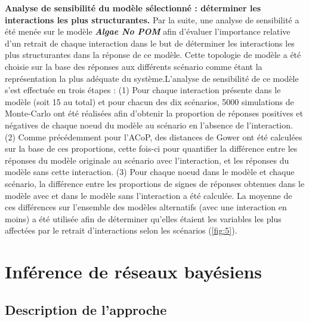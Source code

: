 \documentclass[12pt]{report}
\begin{document}
\textbf{Analyse de sensibilité du modèle sélectionné : déterminer les interactions les plus structurantes.} Par la suite, une analyse de sensibilité a été menée sur le modèle \textbf{\textit{Algae No POM}} afin d'évaluer l'importance relative d'un retrait de chaque interaction dans le but de déterminer les interactions les plus structurantes dans la réponse de ce modèle. Cette topologie de modèle a été choisie sur la base des réponses aux différents scénario comme étant la représentation la plus adéquate du système.L'analyse de sensibilité de ce modèle s'est effectuée en trois étapes : (1) Pour chaque interaction présente dans le modèle (soit 15 au total) et pour chacun des dix scénarios, 5000 simulations de Monte-Carlo ont été réalisées afin d'obtenir la proportion de réponses positives et négatives de chaque noeud du modèle au scénario en l'absence de l'interaction. (2) Comme précédemment pour l'ACoP, des distances de Gower ont été calculées sur la base de ces proportions, cette fois-ci pour quantifier la différence entre les réponses du modèle originale au scénario avec l'interaction, et les réponses du modèle sans cette interaction. (3) Pour chaque noeud dans le modèle et chaque scénario, la différence entre les proportions de signes de réponses obtenues dans le modèle avec et dans le modèle sans l'interaction a été calculée. La moyenne de ces différences sur l'ensemble des modèles alternatifs (avec une interaction en moins) a été utilisée afin de déterminer qu'elles étaient les variables les plus affectées par le retrait d'interactions selon les scénarios (\autoref{fig:5}).


    \section{Inférence de réseaux bayésiens}
        
        \subsection{Description de l'approche}
\end{document}
